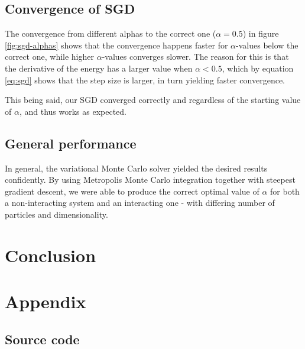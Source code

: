 \documentclass[
]{article}
\begin{document}
\hypertarget{convergence-of-sgd}{%
\subsection*{Convergence of SGD}\label{convergence-of-sgd}}

The convergence from different alphas to the correct one
(\(\alpha = 0.5\)) in figure \ref{fig:sgd-alphas} shows that the
convergence happens faster for \(\alpha\)-values below the correct one,
while higher \(\alpha\)-values converges slower. The reason for this is
that the derivative of the energy has a larger value when
\(\alpha < 0.5\), which by equation \eqref{eq:sgd} shows that the step
size is larger, in turn yielding faster convergence.

This being said, our SGD converged correctly and regardless of the
starting value of \(\alpha\), and thus works as expected.

\hypertarget{general-performance}{%
\subsection*{General performance}\label{general-performance}}

In general, the variational Monte Carlo solver yielded the desired
results confidently. By using Metropolis Monte Carlo integration
together with steepest gradient descent, we were able to produce the
correct optimal value of \(\alpha\) for both a non-interacting system
and an interacting one - with differing number of particles and
dimensionality.

\hypertarget{conclusion}{%
\section{Conclusion}\label{conclusion}}

\clearpage
\appendix

\hypertarget{appendix}{%
\section{Appendix}\label{appendix}}

\hypertarget{source-code}{%
\subsection{Source code}\label{source-code}}
\end{document}
